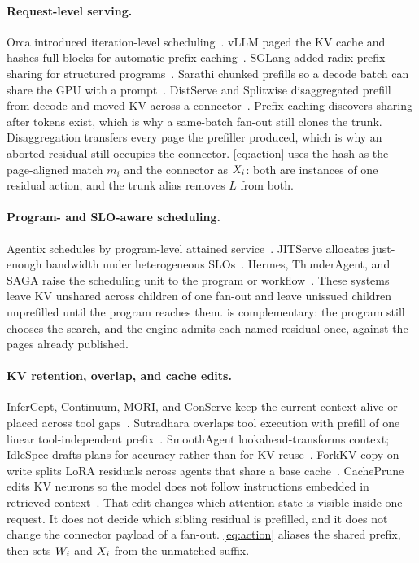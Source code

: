 \paragraph{Request-level serving.}
Orca introduced iteration-level scheduling~\cite{orca}.
vLLM paged the KV cache and hashes full blocks for automatic prefix caching~\cite{vllm}.
SGLang added radix prefix sharing for structured programs~\cite{sglang}.
Sarathi chunked prefills so a decode batch can share the GPU with a prompt~\cite{sarathi,sarathisplit}.
DistServe and Splitwise disaggregated prefill from decode and moved KV across a connector~\cite{distserve,splitwise}.
Prefix caching discovers sharing after tokens exist, which is why a same-batch fan-out still clones the trunk.
Disaggregation transfers every page the prefiller produced, which is why an aborted residual still occupies the connector.
\eqref{eq:action} uses the hash as the page-aligned match $m_i$ and the connector as $X_i$: both are instances of one residual action, and the trunk alias removes $L$ from both.

\paragraph{Program- and SLO-aware scheduling.}
Agentix schedules by program-level attained service~\cite{autellix}.
JITServe allocates just-enough bandwidth under heterogeneous SLOs~\cite{jitserve}.
Hermes, ThunderAgent, and SAGA raise the scheduling unit to the program or workflow~\cite{hermes,thunderagent,saga}.
These systems leave KV unshared across children of one fan-out and leave unissued children unprefilled until the program reaches them.
\sys is complementary: the program still chooses the search, and the engine admits each named residual once, against the pages already published.

\paragraph{KV retention, overlap, and cache edits.}
InferCept, Continuum, MORI, and ConServe keep the current context alive or placed across tool gaps~\cite{infercept,continuum,mori,conserve}.
Sutradhara overlaps tool execution with prefill of one linear tool-independent prefix~\cite{sutradhara}.
SmoothAgent lookahead-transforms context; IdleSpec drafts plans for accuracy rather than for KV reuse~\cite{smoothagent,idlespec}.
ForkKV copy-on-write splits LoRA residuals across agents that share a base cache~\cite{forkkv}.
CachePrune edits KV neurons so the model does not follow instructions embedded in retrieved context~\cite{cacheprune}.
That edit changes which attention state is visible inside one request.
It does not decide which sibling residual is prefilled, and it does not change the connector payload of a fan-out.
\eqref{eq:action} aliases the shared prefix, then sets $W_i$ and $X_i$ from the unmatched suffix.

